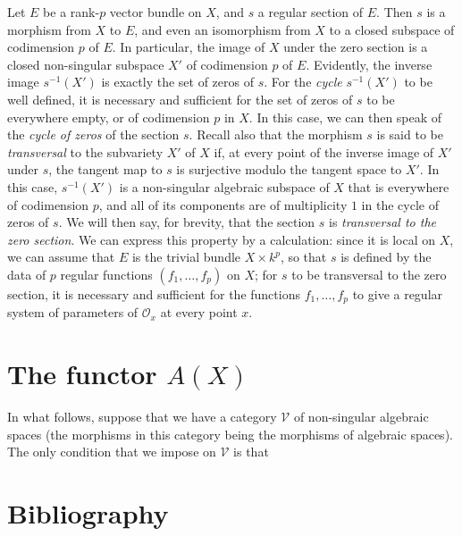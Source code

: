 \documentclass{article}
\newcommand{\oldpage}[1]{\marginpar{\footnotesize$\Big\vert$ \textit{p.~#1}}}
\begin{document}
Let \(E\) be a rank-\(p\) vector bundle on \(X\), and \(s\) a regular section of \(E\).
Then \(s\) is a morphism from \(X\) to \(E\), and even an isomorphism from \(X\) to a closed subspace of codimension \(p\) of \(E\).
In particular, the image of \(X\) under the zero section is a closed non-singular subspace \(X'\) of codimension \(p\) of \(E\).
Evidently, the inverse image \(s^{-1}(X')\) is exactly the set of zeros of \(s\).
For the \emph{cycle} \(s^{-1}(X')\) to be well defined, it is necessary and sufficient for the set of zeros of \(s\) to be everywhere empty, or of codimension \(p\) in \(X\).
In this case, we can then speak of the \emph{cycle of zeros} of the section \(s\).
Recall also that the morphism \(s\) is said to be \emph{transversal} to the subvariety \(X'\) of \(X\) if, at every point of the inverse image of \(X'\) under \(s\), the tangent map to \(s\) is surjective modulo the tangent space to \(X'\).
In this case, \(s^{-1}(X')\) is a non-singular algebraic subspace of \(X\) that is everywhere of codimension \(p\), and all of its components are of multiplicity \(1\) in the cycle of zeros of \(s\).
We will then say, for brevity, that the section \(s\) is \emph{transversal to the zero section}.
We can express this property by a calculation:
since it is local on \(X\), we can assume that \(E\) is the trivial bundle \(X\times k^p\), so that \(s\) is defined by the data of \(p\) regular functions \((f_1,\ldots,f_p)\) on \(X\);
for \(s\) to be transversal to the zero section, it is necessary and sufficient for the functions \(f_1,\ldots,f_p\) to give a regular system of parameters of \({\mathscr{O}}_x\) at every point \(x\).

\hypertarget{section-2}{%
\section{\texorpdfstring{The functor \(A(X)\)}{The functor A(X)}}\label{section-2}}

\oldpage{140}

In what follows, suppose that we have a category \({\mathcal{V}}\) of non-singular algebraic spaces (the morphisms in this category being the morphisms of algebraic spaces).
The only condition that we impose on \({\mathcal{V}}\) is that

\hypertarget{bibliography}{%
\section*{Bibliography}\label{bibliography}}
\end{document}
